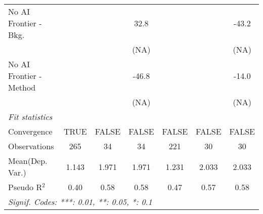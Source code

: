 \begin{tabular}{lcccccc}
   No AI Frontier - Bkg.   &             &       & 32.8  &        &       & -43.2\\   
                           &             &       & (NA)  &        &       & (NA)\\   
   No AI Frontier - Method &             &       & -46.8 &        &       & -14.0\\   
                           &             &       & (NA)  &        &       & (NA)\\   
   \midrule
   \emph{Fit statistics}\\
   Convergence             &TRUE         & FALSE & FALSE & FALSE  & FALSE & FALSE\\  
   Observations            & 265         & 34    & 34    & 221    & 30    & 30\\  
Mean(Dep. Var.) & 1.143 & 1.971 & 1.971 & 1.231 & 2.033 & 2.033 \\
   Pseudo R$^2$            & 0.40        & 0.58  & 0.58  & 0.47   & 0.57  & 0.58\\  
   \midrule \midrule
   \multicolumn{7}{l}{\emph{Signif. Codes: ***: 0.01, **: 0.05, *: 0.1}}\\
\end{tabular}
\par\endgroup

